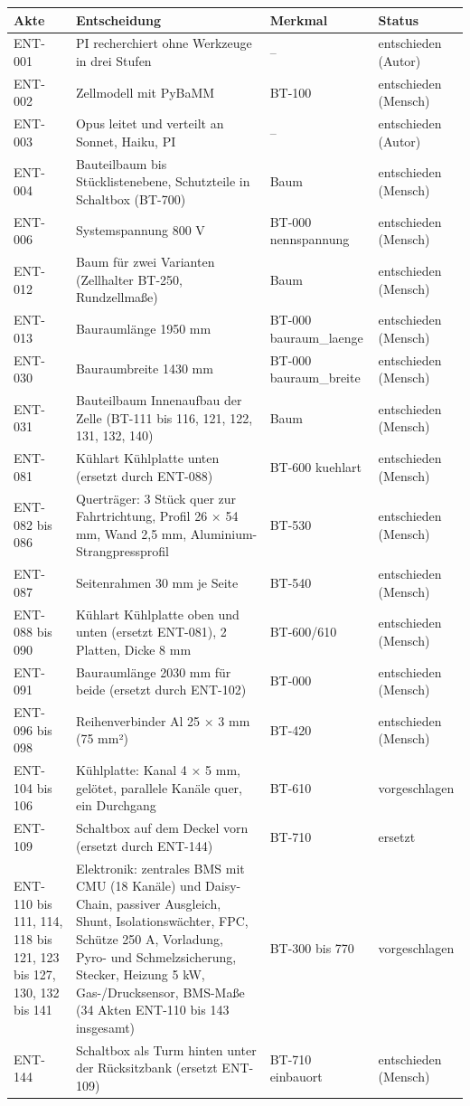 \documentclass[10pt,a4paper]{article}
\begin{document}
\begin{longtable}{@{}p{1.6cm}p{7.0cm}p{3.8cm}p{2.0cm}@{}}\toprule
\textbf{Akte} & \textbf{Entscheidung} & \textbf{Merkmal} & \textbf{Status}\\\midrule\endhead
ENT-001 & PI recherchiert ohne Werkzeuge in drei Stufen & – & entschieden (Autor)\\
ENT-002 & Zellmodell mit PyBaMM & BT-100 & entschieden (Mensch)\\
ENT-003 & Opus leitet und verteilt an Sonnet, Haiku, PI & – & entschieden (Autor)\\
ENT-004 & Bauteilbaum bis Stücklistenebene, Schutzteile in Schaltbox (BT-700) & Baum & entschieden (Mensch)\\
ENT-006 & Systemspannung 800 V & BT-000 nennspannung & entschieden (Mensch)\\
ENT-012 & Baum für zwei Varianten (Zellhalter BT-250, Rundzellmaße) & Baum & entschieden (Mensch)\\
ENT-013 & Bauraumlänge 1950 mm & BT-000 bauraum\_laenge & entschieden (Mensch)\\
ENT-030 & Bauraumbreite 1430 mm & BT-000 bauraum\_breite & entschieden (Mensch)\\
ENT-031 & Bauteilbaum Innenaufbau der Zelle (BT-111 bis 116, 121, 122, 131, 132, 140) & Baum & entschieden (Mensch)\\
ENT-081 & Kühlart Kühlplatte unten (ersetzt durch ENT-088) & BT-600 kuehlart & entschieden (Mensch)\\
ENT-082 bis 086 & Querträger: 3 Stück quer zur Fahrtrichtung, Profil 26 × 54 mm, Wand 2,5 mm, Aluminium-Strangpressprofil & BT-530 & entschieden (Mensch)\\
ENT-087 & Seitenrahmen 30 mm je Seite & BT-540 & entschieden (Mensch)\\
ENT-088 bis 090 & Kühlart Kühlplatte oben und unten (ersetzt ENT-081), 2 Platten, Dicke 8 mm & BT-600/610 & entschieden (Mensch)\\
ENT-091 & Bauraumlänge 2030 mm für beide (ersetzt durch ENT-102) & BT-000 & entschieden (Mensch)\\
ENT-096 bis 098 & Reihenverbinder Al 25 × 3 mm (75 mm²) & BT-420 & entschieden (Mensch)\\
ENT-104 bis 106 & Kühlplatte: Kanal 4 × 5 mm, gelötet, parallele Kanäle quer, ein Durchgang & BT-610 & vorgeschlagen\\
ENT-109 & Schaltbox auf dem Deckel vorn (ersetzt durch ENT-144) & BT-710 & ersetzt\\
ENT-110 bis 111, 114, 118 bis 121, 123 bis 127, 130, 132 bis 141 & Elektronik: zentrales BMS mit CMU (18 Kanäle) und Daisy-Chain, passiver Ausgleich, Shunt, Isolationswächter, FPC, Schütze 250 A, Vorladung, Pyro- und Schmelzsicherung, Stecker, Heizung 5 kW, Gas-/Drucksensor, BMS-Maße (34 Akten ENT-110 bis 143 insgesamt) & BT-300 bis 770 & vorgeschlagen\\
ENT-144 & Schaltbox als Turm hinten unter der Rücksitzbank (ersetzt ENT-109) & BT-710 einbauort & entschieden (Mensch)\\\bottomrule
\end{longtable}
\end{document}
